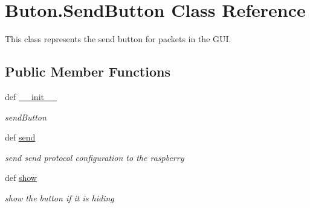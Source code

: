 \hypertarget{classButon_1_1SendButton}{\section{Buton.\+Send\+Button Class Reference}
\label{classButon_1_1SendButton}
}


This class represents the send button for packets in the G\+U\+I.  


\subsection*{Public Member Functions}
\begin{DoxyCompactItemize}
\item 
def \hyperlink{classButon_1_1SendButton_aa12b6257598cbc8304a993fbcf0d85ec}{\+\_\+\+\_\+init\+\_\+\+\_\+}
\begin{DoxyCompactList}\small\item\em send\+Button \end{DoxyCompactList}\item 
\hypertarget{classButon_1_1SendButton_ac35254e6f2349696284a95a28082897c}{def \hyperlink{classButon_1_1SendButton_ac35254e6f2349696284a95a28082897c}{send}}\label{classButon_1_1SendButton_ac35254e6f2349696284a95a28082897c}

\begin{DoxyCompactList}\small\item\em send send protocol configuration to the raspberry \end{DoxyCompactList}\item 
\hypertarget{classButon_1_1SendButton_a0f5cea8750fe292811dc28bbeb87b24b}{def \hyperlink{classButon_1_1SendButton_a0f5cea8750fe292811dc28bbeb87b24b}{show}}\label{classButon_1_1SendButton_a0f5cea8750fe292811dc28bbeb87b24b}

\begin{DoxyCompactList}\small\item\em show the button if it is hiding \end{DoxyCompactList}\end{DoxyCompactItemize}
